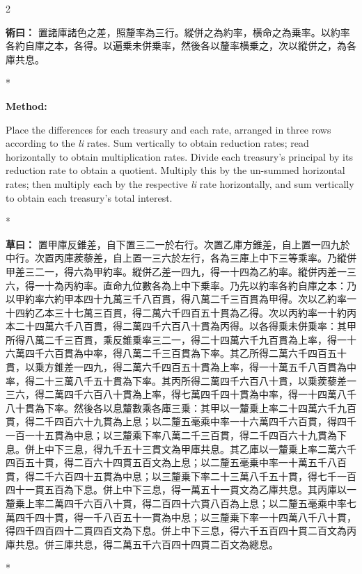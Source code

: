 \documentclass[11pt,a4paper]{article}
\newcommand{\CnMethod}[1]{\par\noindent\textbf{\color{methodcolor}術曰：}#1\par\vspace{0.5ex}}
\newcommand{\CnWorking}[1]{\par\noindent\textbf{草曰：}#1\par\vspace{0.5ex}}
\newcommand{\EnMethod}{\par\noindent\textbf{\color{methodcolor}Method:}\par\vspace{0.5ex}}
\newcommand{\switchCn}{\switchcolumn[0]*}
\newcommand{\switchEn}{\switchcolumn[1]*}
\begin{document}
\begin{paracol}{2}

\CnMethod{%
置諸庫諸色之差，照釐率為三行。縱併之為約率，横命之為乗率。以約率各約自庫之本，各得。以遍乗未併乗率，然後各以釐率横乗之，次以縱併之，為各庫共息。
}

\switchEn

\EnMethod
Place the differences for each treasury and each rate, arranged in three rows according to the \textit{li} rates. Sum vertically to obtain reduction rates; read horizontally to obtain multiplication rates. Divide each treasury's principal by its reduction rate to obtain a quotient. Multiply this by the un-summed horizontal rates; then multiply each by the respective \textit{li} rate horizontally, and sum vertically to obtain each treasury's total interest.

\switchCn

\CnWorking{%
置甲庫反錐差，自下置三二一於右行。次置乙庫方錐差，自上置一四九於中行。次置丙庫蒺藜差，自上置一三六於左行，各為三庫上中下三等乘率。乃縱併甲差三二一，得六為甲約率。縱併乙差一四九，得一十四為乙約率。縱併丙差一三六，得一十為丙約率。直命九位數各為上中下乗率。乃先以約率各約自庫之本：乃以甲約率六約甲本四十九萬三千八百貫，得八萬二千三百貫為甲得。次以乙約率一十四約乙本三十七萬三百貫，得二萬六千四百五十貫為乙得。次以丙約率一十約丙本二十四萬六千八百貫，得二萬四千六百八十貫為丙得。以各得乗未併乗率：其甲所得八萬二千三百貫，乘反錐乗率三二一，得二十四萬六千九百貫為上率，得一十六萬四千六百貫為中率，得八萬二千三百貫為下率。其乙所得二萬六千四百五十貫，以乗方錐差一四九，得二萬六千四百五十貫為上率，得一十萬五千八百貫為中率，得二十三萬八千五十貫為下率。其丙所得二萬四千六百八十貫，以乗蒺藜差一三六，得二萬四千六百八十貫為上率，得七萬四千四十貫為中率，得一十四萬八千八十貫為下率。然後各以息釐數乘各庫三乗：其甲以一釐乗上率二十四萬六千九百貫，得二千四百六十九貫為上息；以二釐五毫乘中率一十六萬四千六百貫，得四千一百一十五貫為中息；以三釐乘下率八萬二千三百貫，得二千四百六十九貫為下息。併上中下三息，得九千五十三貫文為甲庫共息。其乙庫以一釐乗上率二萬六千四百五十貫，得二百六十四貫五百文為上息；以二釐五毫乗中率一十萬五千八百貫，得二千六百四十五貫為中息；以三釐乗下率二十三萬八千五十貫，得七千一百四十一貫五百為下息。併上中下三息，得一萬五十一貫文為乙庫共息。其丙庫以一釐乗上率二萬四千六百八十貫，得二百四十六貫八百為上息；以二釐五毫乘中率七萬四千四十貫，得一千八百五十一貫為中息；以三釐乗下率一十四萬八千八十貫，得四千四百四十二貫四百文為下息。併上中下三息，得六千五百四十貫二百文為丙庫共息。併三庫共息，得二萬五千六百四十四貫二百文為總息。
}

\switchEn


\end{paracol}
\end{document}
